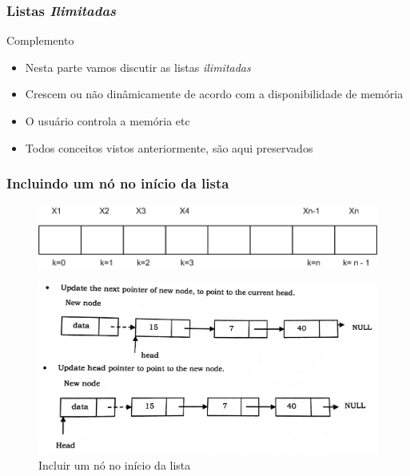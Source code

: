 \begin{frame}
\frametitle{Listas \textit{Ilimitadas}}
\begin{block}{Complemento}

\begin{itemize}
  \item Nesta parte vamos discutir as listas \textit{ilimitadas}
  \item Crescem ou não dinâmicamente de acordo com a disponibilidade de memória
  \item O usuário controla a memória etc
  \item Todos conceitos vistos anteriormente, são aqui preservados
\end{itemize}

\end{block}

\end{frame} 




\begin{frame}%
\frametitle{Incluindo um nó no início da lista}

\begin{figure}[!ht]
	\centering
	\includegraphics[width=.6\textwidth]{figs/fig_listas/lista-linear}
	\end{figure} 

\begin{figure}[!hb]
	\centering
		\includegraphics[height=0.50\paperheight, width=0.5\paperwidth]{figs/fig_listas/insere_inicio}			
			\caption{Incluir um nó no início da lista}	
			\end{figure} 


\end{frame} 

